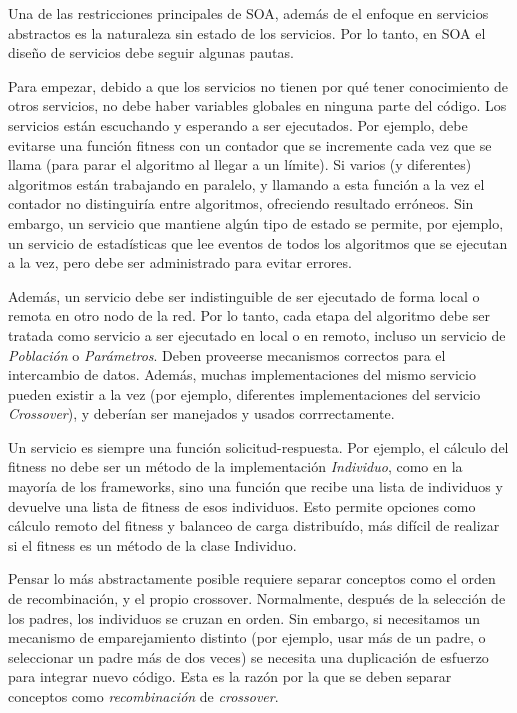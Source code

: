 \documentclass[runningheads]{llncs}
\begin{document}
Una de las restricciones principales de SOA, además de el enfoque en servicios abstractos es la naturaleza sin estado de los servicios. Por lo tanto, en SOA el diseño de servicios debe seguir algunas pautas.

Para empezar, debido a que los servicios no tienen por qué tener conocimiento de otros servicios, no debe haber variables globales en ninguna parte del código. Los servicios están escuchando y esperando a ser ejecutados. Por ejemplo, debe evitarse una función fitness con un contador que se incremente cada vez que se llama (para parar el algoritmo al llegar a un límite). Si varios (y diferentes) algoritmos están trabajando en paralelo, y llamando a esta función a la vez el contador no distinguiría entre algoritmos, ofreciendo resultado erróneos. Sin embargo, un servicio que mantiene algún tipo de estado se permite, por ejemplo, un servicio de estadísticas que lee eventos de todos los algoritmos que se ejecutan a la vez, pero debe ser administrado para evitar errores.

Además, un servicio debe ser indistinguible de ser ejecutado de forma local o remota en otro nodo de la red. Por lo tanto, cada etapa del algoritmo debe ser tratada como servicio a ser ejecutado en local o en remoto, incluso un servicio de {\em Población} o {\em Parámetros}. Deben proveerse mecanismos correctos para el intercambio de datos. Además, muchas implementaciones del mismo servicio pueden existir a la vez (por ejemplo, diferentes implementaciones del servicio {\em Crossover}), y deberían ser manejados y usados corrrectamente.

Un servicio es siempre una función solicitud-respuesta. Por ejemplo, el cálculo del fitness no debe ser un método de la implementación {\em Individuo},  como en la mayoría de los frameworks, sino una función que recibe una lista de individuos y devuelve una lista de fitness de esos individuos. Esto permite opciones como cálculo remoto del fitness y balanceo de carga distribuído, más difícil de realizar si el fitness es un método de la clase Individuo.

Pensar lo más abstractamente posible requiere separar conceptos como el orden de recombinación, y el propio crossover. Normalmente, después de la selección de los padres, los individuos se cruzan en orden. Sin embargo, si necesitamos un mecanismo de emparejamiento distinto (por ejemplo, usar más de un padre, o seleccionar un padre más de dos veces) se necesita una duplicación de esfuerzo para integrar nuevo código. Esta es la razón por la que se deben separar conceptos como {\em recombinación} de {\em crossover}. 
\end{document}
